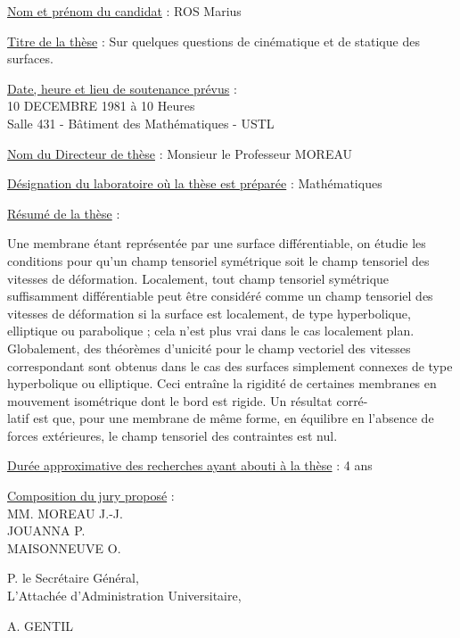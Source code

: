 \uline{Nom et prénom du candidat} : ROS Marius

\uline{Titre de la thèse} : Sur quelques questions de cinématique et de statique des surfaces.

\uline{Date, heure et lieu de soutenance prévus} :\\
10 DECEMBRE 1981 à 10 Heures\\
Salle 431 - Bâtiment des Mathématiques - USTL

\uline{Nom du Directeur de thèse} : Monsieur le Professeur MOREAU

\uline{Désignation du laboratoire où la thèse est préparée} : Mathématiques

\uline{Résumé de la thèse} :

Une membrane étant représentée par une surface différentiable, on étudie les conditions pour qu'un champ tensoriel symétrique soit le champ tensoriel des vitesses de déformation. Localement, tout champ tensoriel symétrique suffisamment différentiable peut être considéré comme un champ tensoriel des vitesses de déformation si la surface est localement, de type hyperbolique, elliptique ou parabolique ; cela n'est plus vrai dans le cas localement plan. Globalement, des théorèmes d'unicité pour le champ vectoriel des vitesses correspondant sont obtenus dans le cas des surfaces simplement connexes de type hyperbolique ou elliptique. Ceci entraîne la rigidité de certaines membranes en mouvement isométrique dont le bord est rigide. Un résultat corré-\\
latif est que, pour une membrane de même forme, en équilibre en l'absence de forces extérieures, le champ tensoriel des contraintes est nul.

\uline{Durée approximative des recherches ayant abouti à la thèse} : 4 ans

\uline{Composition du jury proposé} :\\
MM. MOREAU J.-J.\\
JOUANNA P.\\
MAISONNEUVE O.

P. le Secrétaire Général,\\
L'Attachée d'Administration Universitaire,

A. GENTIL

